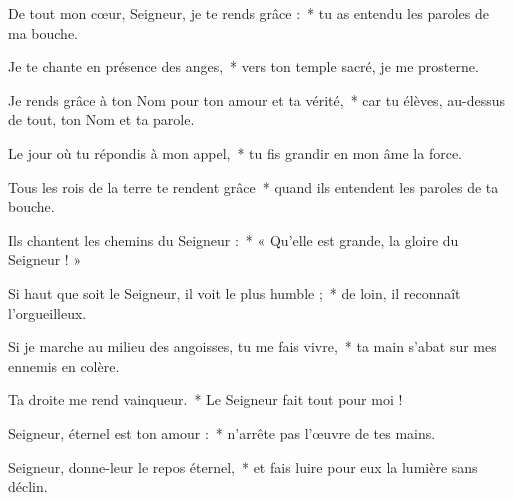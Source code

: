 \item De tout mon cœur, Seigneur, je te rends grâce :~* tu as entendu les paroles de ma bouche.

\item Je te chante en présence des anges,~* vers ton temple sacré, je me prosterne.

\item Je rends grâce à ton Nom pour ton amour et ta vérité,~* car tu élèves, au-dessus de tout, ton Nom et ta parole.

\item Le jour où tu répondis à mon appel,~* tu fis grandir en mon âme la force.

\item Tous les rois de la terre te rendent grâce~* quand ils entendent les paroles de ta bouche.

\item Ils chantent les chemins du Seigneur :~* « Qu'elle est grande, la gloire du Seigneur ! »

\item Si haut que soit le Seigneur, il voit le plus humble ;~* de loin, il reconnaît l'orgueilleux.

\item Si je marche au milieu des angoisses, tu me fais vivre,~* ta main s'abat sur mes ennemis en colère.

\item Ta droite me rend vainqueur.~* Le Seigneur fait tout pour moi !

\item Seigneur, éternel est ton amour :~* n'arrête pas l'œuvre de tes mains.

\item Seigneur, donne-leur le repos éternel,~* et fais luire pour eux la lumière sans déclin.
